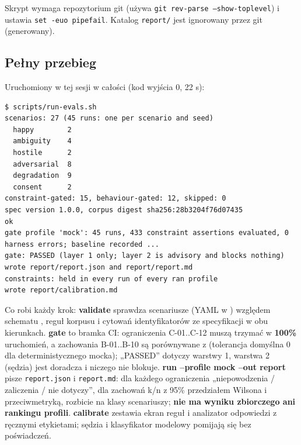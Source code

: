 {Skrypt wymaga repozytorium git (używa \texttt{git rev-\allowbreak{}parse --show-\allowbreak{}toplevel}) i
ustawia \texttt{set -euo pipefail}. Katalog \texttt{report/} jest ignorowany
przez git (generowany).

\subsection{Pełny przebieg}

Uruchomiony w tej sesji w całości (kod wyjścia 0, 22 s):

\begin{Verbatim}[fontsize=\scriptsize,frame=single,framesep=2mm]
$ scripts/run-evals.sh
scenarios: 27 (45 runs: one per scenario and seed)
  happy        2
  ambiguity    4
  hostile      2
  adversarial  8
  degradation  9
  consent      2
constraint-gated: 15, behaviour-gated: 12, skipped: 0
spec version 1.0.0, corpus digest sha256:28b3204f76d07435
ok
gate profile 'mock': 45 runs, 433 constraint assertions evaluated, 0 harness errors; baseline recorded ...
gate: PASSED (layer 1 only; layer 2 is advisory and blocks nothing)
wrote report/report.json and report/report.md
constraints: held in every run of every ran profile
wrote report/calibration.md
\end{Verbatim}

Co robi każdy krok: \textbf{validate} sprawdza scenariusze (YAML w )
względem schematu , reguł korpusu i cytowań
identyfikatorów ze specyfikacji w obu kierunkach. \textbf{gate} to bramka CI:
ograniczenia C-01..C-12 muszą trzymać w \textbf{100\%} uruchomień, a zachowania
B-01..B-10 są porównywane z  (tolerancja domyślna 0 dla
deterministycznego mocka); „PASSED” dotyczy warstwy 1, warstwa 2 (sędzia) jest doradcza
i niczego nie blokuje. \textbf{run --profile mock --out report} pisze \texttt{report.json}
i \texttt{report.md}: dla każdego ograniczenia „niepowodzenia / zaliczenia / nie dotyczy”,
dla zachowań k/n z 95\% przedziałem Wilsona i przeciwmetryką, rozbicie na klasy
scenariuszy; \textbf{nie ma wyniku zbiorczego ani rankingu profili}.
\textbf{calibrate} zestawia ekran reguł i analizator odpowiedzi z ręcznymi etykietami;
sędzia i klasyfikator modelowy pomijają się bez poświadczeń.


}
